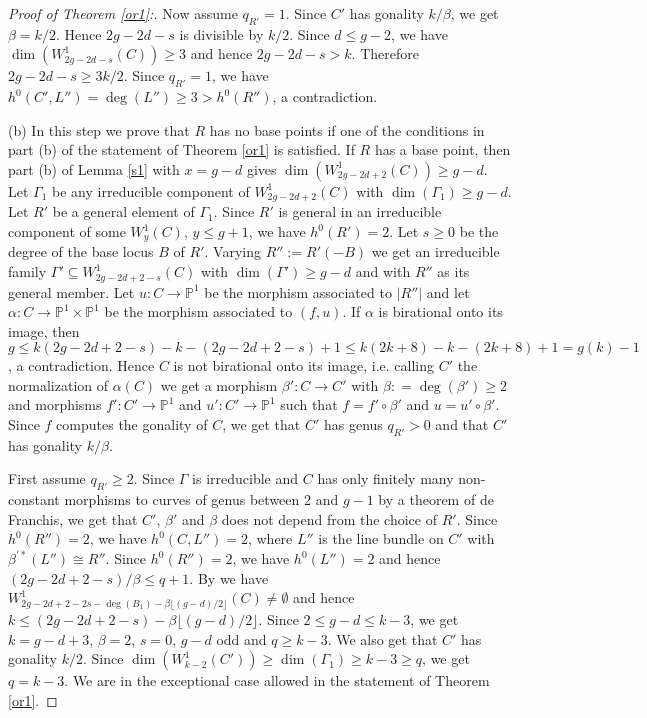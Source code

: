 \documentclass{amsart}
\theoremstyle{plain}
\theoremstyle{definition}
\begin{document}
\begin{proof}[Proof of Theorem \ref{or1}:]
Now assume $q_{R'}=1$. Since $C'$ has gonality $k/\beta$, we get $\beta =k/2$. Hence $2g-2d-s$ is divisible by $k/2$. Since $d\le g-2$, we have $\dim (W^1_{2g-2d-s}({C})) \ge 3$ and hence $2g-2d-s >k$. Therefore $2g-2d-s \ge 3k/2$. Since $q_{R'}=1$, we have $h^0(C',L'') = \deg (L'') \ge 3 > h^0(R'')$, a contradiction.

\quad (b) In this step we prove that $R$ has no base points if one of the conditions in part (b) of the statement of Theorem \ref{or1} is satisfied. If $R$ has a base point, then part (b) of Lemma \ref{s1} with $x=g-d$
gives $\dim (W^1_{2g-2d+2}({C})) \ge g-d$.  Let $\Gamma _1$ be any irreducible component of $W^1_{2g-2d+2}({C})$ with $\dim (\Gamma _1)
\ge g-d$. Let $R'$ be a general element of $\Gamma _1$. Since $R'$ is general in an irreducible component of some $W^1_y({C})$, $y\le g+1$, we have $h^0(R') =2$.
Let $s\ge 0$ be the degree of the base locus $B$
of $R'$. Varying $R'':= R'(-B)$ we get an irreducible family $\Gamma  '\subseteq W^1_{2g-2d+2-s}({C})$ with $\dim (\Gamma ') \ge g-d$ and with $R''$
as its general member. Let $u: C\to \mathbb {P}^1$ be the morphism associated
to $|R''|$ and let $\alpha : C\to \mathbb {P}^1\times \mathbb {P}^1$ be the morphism associated to $(f,u)$. If $\alpha$ is birational onto its image,
then $g\le k(2g-2d+2-s) -k-(2g-2d+2-s) +1 \le k(2k+8)-k-(2k+8)+1 =g(k)-1$, a contradiction. 
Hence $C$ is not birational onto its image, i.e. calling $C'$ the normalization of $\alpha ({C})$ we get a morphism $\beta ': C\to C'$ with $\beta : =\deg (\beta ')\ge 2$ and morphisms $f': C'\to \mathbb {P}^1$ and $u': C'\to \mathbb {P}^1$ such that $f = f'\circ \beta '$ and $u = u'\circ \beta '$. Since $f$ computes the gonality of $C$, we get that $C'$ has genus $q_{R'}>0$ and
that $C'$ has gonality $k/\beta$. 

First assume $q_{R'} \ge 2$. Since $\Gamma$ is irreducible and $C$ has only finitely many non-constant morphisms to curves of genus between $2$ and $g-1$ by a theorem of de Franchis, we get that
$C'$, $\beta '$ and $\beta$ does not depend from the choice of $R'$. Since $h^0(R'')=2$, we have $h^0(C,L'')=2$, where $L''$ is the line bundle on $C'$ with $\beta ^{'\ast }(L'')\cong R''$.
Since $h^0(R'')=2$, we have $h^0(L'') =2$ and hence $(2g-2d+2-s)/\beta \le q+1$.
By \cite[Theorem 1]{fhl} we have $W^1_{2g-2d+2-2s-\deg (B_1)-\beta \lfloor (g-d)/2\rfloor}({C}) \ne \emptyset$
and hence 
$k\le (2g-2d+2-s) -\beta \lfloor (g-d)/2\rfloor$. Since $2 \le g-d \le k-3$, we get $k=g-d+3$, $\beta =2$, $s=0$, $g-d$ odd and $q\ge k-3$. We also get that
$C'$ has gonality $k/2$. Since $\dim (W^1_{k-2}(C')) \ge \dim (\Gamma _1) \ge k-3 \ge q$, we get $q=k-3$. We are in the exceptional case allowed in the
statement of Theorem \ref{or1}.



\end{proof}
\end{document}
